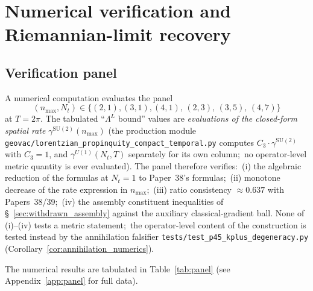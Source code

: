 \documentclass[11pt,a4paper]{article}
\theoremstyle{plain}
\theoremstyle{definition}
\newcommand{\nmax}{n_{\max}}
\newcommand{\Nt}{N_{t}}
\newcommand{\SU}{\mathrm{SU}}
\newcommand{\Uone}{U(1)}
\newcommand{\Lprop}{\Lambda^{L}}
\newcommand{\gammaSU}{\gamma^{\SU(2)}}
\newcommand{\gammaU}{\gamma^{\Uone}}
\begin{document}
\section{Numerical verification and Riemannian-limit recovery}
\label{sec:numerical}

\subsection{Verification panel}\label{sec:panel}

A numerical computation evaluates the panel
\begin{equation*}
   (\nmax, \Nt) \in \{(2, 1), (3, 1), (4, 1),\, (2, 3),\, (3, 5),\, (4, 7)\}
\end{equation*}
at $T = 2\pi$. The tabulated
``$\Lprop$ bound'' values are \emph{evaluations of the closed-form
spatial rate} $\gammaSU(\nmax)$ (the production module
\texttt{geovac/lorentzian\_propinquity\_compact\_temporal.py} computes
$C_{3}\cdot\gammaSU$ with $C_{3} = 1$, and $\gammaU(\Nt, T)$ separately for
its own column;\ no operator-level metric quantity is ever evaluated). The panel
therefore verifies:\ (i) the algebraic reduction of the formulas at
$\Nt = 1$ to Paper~38's formulas;\ (ii) monotone decrease of the rate
expression in $\nmax$;\ (iii) ratio consistency
$\approx 0.637$ with Papers~38/39;\ (iv) the assembly constituent
inequalities of \S~\ref{sec:withdrawn_assembly} against the auxiliary
classical-gradient ball.
None of (i)--(iv) tests a metric statement;\ the operator-level
content of the construction is tested instead by the annihilation
falsifier \texttt{tests/test\_p45\_kplus\_degeneracy.py}
(Corollary~\ref{cor:annihilation_numerics}).

The numerical results are tabulated in Table~\ref{tab:panel}
(see Appendix~\ref{app:panel} for full data).
\end{document}
